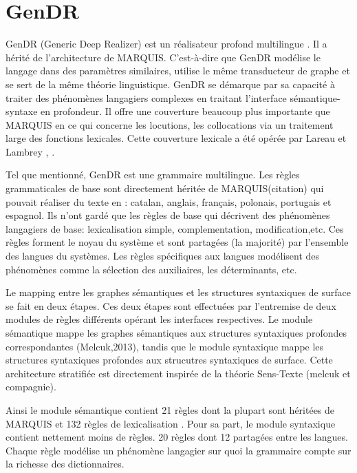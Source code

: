 
\chapter{GenDR}\label{chapgendr}

GenDR (Generic Deep Realizer) est un réalisateur profond multilingue \citep{lareau18}. Il a hérité de l'architecture de MARQUIS. C'est-à-dire que GenDR modélise le langage dans des paramètres similaires, utilise le même transducteur de graphe et se sert de la même théorie linguistique. GenDR se démarque par sa capacité à traiter des phénomènes langagiers complexes en traitant l'interface sémantique-syntaxe en profondeur. Il offre une couverture beaucoup plus importante que MARQUIS en ce qui concerne les locutions, les collocations via un traitement large des fonctions lexicales. Cette couverture lexicale a été opérée par Lareau et Lambrey \cite{LambreyImplementationcollocationspour2017}, \cite{lambrey15}.

Tel que mentionné, GenDR est une grammaire multilingue. Les règles grammaticales de base sont directement héritée de MARQUIS(citation) qui pouvait réaliser du texte en : catalan, anglais, français, polonais, portugais et espagnol. Ils n'ont gardé que les règles de base qui décrivent des phénomènes langagiers de base: lexicalisation simple, complementation, modification,etc. Ces règles forment le noyau du système et sont partagées (la majorité) par l'ensemble des langues du systèmes. Les règles spécifiques aux langues modélisent des phénomènes comme la sélection des auxiliaires, les déterminants, etc.

Le mapping entre les graphes sémantiques et les structures syntaxiques de surface se fait en deux étapes. Ces deux étapes sont effectuées par l'entremise de deux modules de règles différents opérant les interfaces respectives. Le module sémantique mappe les graphes sémantiques aux structures syntaxiques profondes correspondantes (Melcuk,2013), tandis que le module syntaxique mappe les structures syntaxiques profondes aux strucutres syntaxiques de surface. Cette architecture stratifiée est directement inspirée de la théorie Sens-Texte (melcuk et compagnie).

Ainsi le module sémantique contient 21 règles dont la plupart sont héritées de MARQUIS et 132 règles de lexicalisation \citep{LambreyImplementationcollocationspour2017}. Pour sa part, le module syntaxique contient nettement moins de règles. 20 règles dont 12 partagées entre les langues. Chaque règle modélise un phénomène langagier sur quoi la grammaire compte sur la richesse des dictionnaires.

